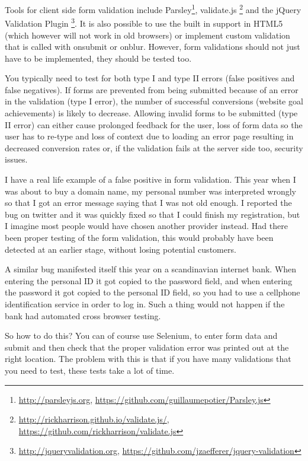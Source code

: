 \documentclass[11pt]{article}
\begin{document}
Tools for client side form validation include Parsley\footnote{\url{http://parsleyjs.org}, \url{https://github.com/guillaumepotier/Parsley.js}}, validate.js \footnote{\url{http://rickharrison.github.io/validate.js/}, \url{https://github.com/rickharrison/validate.js}} and the jQuery Validation Plugin \footnote{\url{http://jqueryvalidation.org}, \url{https://github.com/jzaefferer/jquery-validation}}. It is also possible to use the built in support in HTML5 (which however will not work in old browsers) or implement custom validation that is called with onsubmit or onblur. However, form validations should not just have to be implemented, they should be tested too.

You typically need to test for both type I and type II errors (false positives and false negatives). If forms are prevented from being submitted because of an error in the validation (type I error), the number of successful conversions (website goal achievements) is likely to decrease. Allowing invalid forms to be submitted (type II error) can either cause prolonged feedback for the user, loss of form data so the user has to re-type and loss of context due to loading an error page resulting in decreased conversion rates or, if the validation fails at the server side too, security issues.

I have a real life example of a false positive in form validation. This year when I was about to buy a domain name, my personal number was interpreted wrongly so that I got an error message saying that I was not old enough. I reported the bug on twitter and it was quickly fixed so that I could finish my registration, but I imagine most people would have chosen another provider instead. Had there been proper testing of the form validation, this would probably have been detected at an earlier stage, without losing potential customers. \cite{TwitterMe}

A similar bug manifested itself this year on a scandinavian internet bank. When entering the personal ID it got copied to the password field, and when entering the password it got copied to the personal ID field, so you had to use a cellphone identification service in order to log in. Such a thing would not happen if the bank had automated cross browser testing. \cite[question~38]{Ahnve}

So how to do this? You can of course use Selenium, to enter form data and submit and then check that the proper validation error was printed out at the right location. The problem with this is that if you have many validations that you need to test, these tests take a lot of time.
\end{document}
